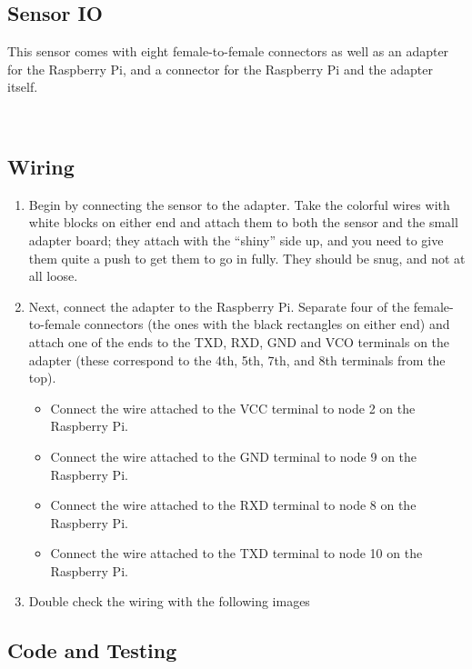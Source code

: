 \documentclass{article}
\begin{document}
\subsection{Sensor IO}

This sensor comes with eight female-to-female connectors as well as an adapter for the Raspberry Pi, and a connector for the Raspberry Pi and the adapter itself.  

\
\subsection{Wiring}

\begin{enumerate}
  \item Begin by connecting the sensor to the adapter. Take the colorful wires with white blocks on either end and attach them to both the sensor and the small adapter board; they attach with the ``shiny'' side up, and you need to give them quite a push to get them to go in fully. They should be snug, and not at all loose.

  \item Next, connect the adapter to the Raspberry Pi.  Separate four of the female-to-female connectors (the ones with the black rectangles on either end) and attach one of the ends to the TXD, RXD, GND and VCO terminals on the adapter (these correspond to the 4th, 5th, 7th, and 8th terminals from the top).  

\begin{itemize}
  \item Connect the wire attached to the VCC terminal to node 2 on the Raspberry Pi.

  \item Connect the wire attached to the GND terminal to node 9 on the Raspberry Pi.

  \item Connect the wire attached to the RXD terminal to node 8 on the Raspberry Pi. 

  \item Connect the wire attached to the TXD terminal to node 10 on the Raspberry Pi.
\end{itemize}

\item Double check the wiring with the following images



\end{enumerate}


\subsection{Code and Testing}
\end{document}
